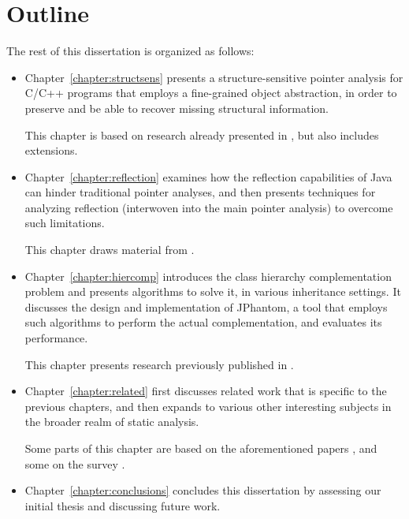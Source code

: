 \section{Outline}


The rest of this dissertation is organized as follows:
\begin{itemize}[--]
\item Chapter~\ref{chapter:structsens} presents a structure-sensitive
  pointer analysis for C/C++ programs that employs a fine-grained
  object abstraction, in order to preserve and be able to recover
  missing structural information.

  This chapter is based on research already presented in
  \emph{} \cite{structsens}, but also includes
  extensions.
\item Chapter~\ref{chapter:reflection} examines how the reflection
  capabilities of Java can hinder traditional pointer analyses, and
  then presents techniques for analyzing reflection (interwoven into
  the main pointer analysis) to overcome such limitations.

  This chapter draws material from \emph{}
  \cite{reflection}.
\item Chapter~\ref{chapter:hiercomp} introduces the class hierarchy
  complementation problem and presents algorithms to solve it, in
  various inheritance settings. It discusses the design and
  implementation of JPhantom, a tool that employs such algorithms to
  perform the actual complementation, and evaluates its performance.

  This chapter presents research previously published in
  \emph{} \cite{jphantom}.
\item Chapter~\ref{chapter:related} first discusses related work that
  is specific to the previous chapters, and then expands to various
  other interesting subjects in the broader realm of static analysis.

  Some parts of this chapter are based on the aforementioned papers
  \cite{structsens,reflection,jphantom}, and some on the survey
  \emph{} \cite{survey}.
\item Chapter~\ref{chapter:conclusions} concludes this dissertation by
  assessing our initial thesis and discussing future work.
\end{itemize}

